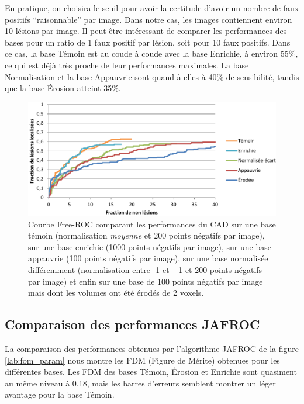 En pratique, on choisira le seuil pour avoir la certitude d'avoir un nombre de faux positifs ``raisonnable'' par image. Dans notre cas, les images contiennent environ 10 lésions par image. Il peut être intéressant de comparer les performances des bases pour un ratio de 1 faux positif par lésion, soit pour 10 faux positifs. Dans ce cas, la base Témoin est au coude à coude avec la base Enrichie, à environ 55\%, ce qui est déjà très proche de leur performances maximales. La base Normalisation et la base Appauvrie sont quand à elles à 40\% de sensibilité, tandis que la base Érosion atteint 35\%.


\begin{figure}[h!]
 
 \begin{center}
   \includegraphics[width=15cm]{images/FROC_param}
 \end{center}
 \caption{Courbe Free-ROC comparant les performances du CAD sur une base témoin (normalisation \emph{moyenne} et 200 points négatifs par image), sur une base enrichie (1000 points négatifs par image), sur une base appauvrie (100 points négatifs par image), sur une base normalisée différemment (normalisation entre -1 et +1 et 200 points négatifs par image) et enfin sur une base de 100 points négatifs par image mais dont les volumes ont été érodés de 2 voxels.}
 \label{lab:froc_comp_static}
\end{figure}


\subsection{Comparaison des performances JAFROC}

La comparaison des performances obtenues par l'algorithme JAFROC \cite{chakraborty1990free} de la figure \ref{lab:fom_param} nous montre les FDM (Figure de Mérite) obtenues pour les différentes bases. Les FDM des bases Témoin, Érosion et Enrichie sont quasiment au même niveau à 0.18, mais les barres d'erreurs semblent montrer un léger avantage pour la base Témoin.

